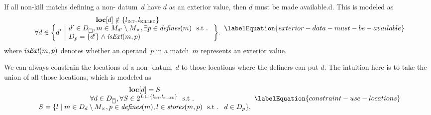 If all non-\glspl{kill match} defining a non-
\gls{datum}~$d$ have $d$ as an \gls{exterior value}, then $d$ must be made
\gls{available.d}.
%
This is modeled as
%
\begin{equation}
  \begin{array}{c}
    \mVar{loc}[d] \notin \mSet{\mIntLocation, \mKilledLocation} \\
    \forall d \in
      \mSetBuilder*{d'}%
                   {%
                     \begin{array}{@{}l@{}}
                       d' \in \mStateDataCompSet,
                       m \in \mMatchSet[d'] \setminus \mKillMatchSet,
                       \exists p \in \mDefines(m) \text{ \st} \\
                       \mDataSet[p] = \mSet{d'}
                       \mAnd
                       \mIsExt(m, p)
                     \end{array}
                   } \!.
  \end{array}
  \labelEquation{exterior-data-must-be-available}
\end{equation}
%
where \mbox{$\operatorname{\textit{isExt}}(m, p)$} denotes whether an \gls{operand}~$p$ in a
\gls{match}~$m$ represents an \gls{exterior value}.

We can always constrain the locations of a non-
\gls{datum}~$d$ to those locations where the definers can put $d$.
%
The intuition here is to take the union of all those locations, which is modeled
as
%
\begin{equation}
  \begin{array}{c}
    \mVar{loc}[d] = S \\
    \forall d \in \mStateDataCompSet,
    \forall S \in
      \mPowerset{\mLocationSet
      \, \cup \,
      \mSet{\mIntLocation, \mKilledLocation}} \text{ \st} \\
    S = \mSetBuilder{l}%
                    {%
                      m \in \mDataSet[d] \setminus \mKillMatchSet,
                      p \in \mDefines(m),
                      l \in \mStores(m, p)
                      \text{ \st }
                      d \in \mDataSet[p]
                    },
  \end{array}
  \labelEquation{constraint-use-locations}
\end{equation}

